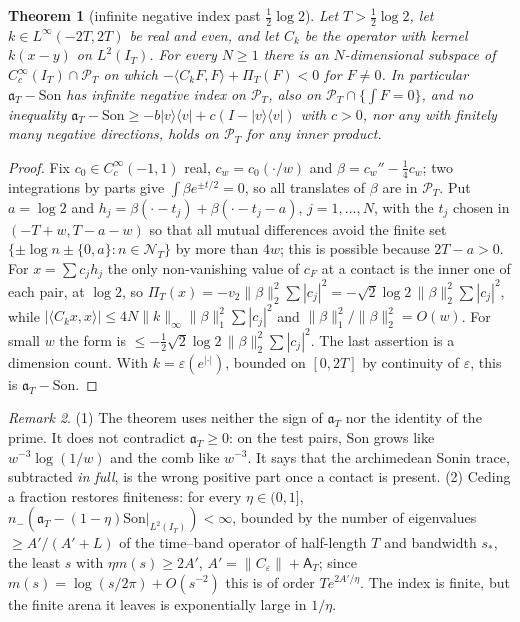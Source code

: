 \documentclass[11pt]{amsart}
\newtheorem{theorem}{Theorem}[section]
\theoremstyle{definition}
\theoremstyle{remark}
\newtheorem{remark}[theorem]{Remark}
\newcommand{\IT}{I_T}
\newcommand{\PT}{\mathcal P_T}
\newcommand{\cF}{c_F}
\newcommand{\NT}{\mathcal N_T}
\newcommand{\Aconst}{\mathsf A_T}
\newcommand{\PiT}{\Pi_T}
\newcommand{\Son}{\mathrm{Son}}
\begin{document}
\begin{theorem}[infinite negative index past $\frac12\log2$]\label{thm:nogo}
Let $T>\frac12\log2$, let $k\in L^\infty(-2T,2T)$ be real and even, and let $C_k$ be the operator with kernel
$k(x-y)$ on $L^2(\IT)$. For every $N\ge1$ there is an $N$-dimensional subspace of $C_c^\infty(\IT)\cap\PT$ on which
$-\langle C_kF,F\rangle+\PiT(F)<0$ for $F\neq0$. In particular $\mathfrak a_T-\Son$ has infinite negative index on
$\PT$, also on $\PT\cap\{\int F=0\}$, and no inequality
$\mathfrak a_T-\Son\ge-b|v\rangle\langle v|+c(I-|v\rangle\langle v|)$ with $c>0$, nor any with finitely many negative
directions, holds on $\PT$ for any inner product.
\end{theorem}
\begin{proof}
Fix $c_0\in C_c^\infty(-1,1)$ real, $c_w=c_0(\cdot/w)$ and $\beta=c_w''-\frac14c_w$; two integrations by parts give
$\int\beta e^{\pm t/2}=0$, so all translates of $\beta$ are in $\PT$. Put $a=\log2$ and
$h_j=\beta(\cdot-t_j)+\beta(\cdot-t_j-a)$, $j=1,\dots,N$, with the $t_j$ chosen in $(-T+w,T-a-w)$ so that all mutual
differences avoid the finite set $\{\pm\log n\pm\{0,a\}:n\in\NT\}$ by more than $4w$; this is possible because
$2T-a>0$. For $x=\sum c_jh_j$ the only non-vanishing value of $\cF$ at a contact is the inner one of each pair, at
$\log2$, so $\PiT(x)=-v_2\|\beta\|_2^2\sum|c_j|^2=-\sqrt2\log2\,\|\beta\|_2^2\sum|c_j|^2$, while
$|\langle C_kx,x\rangle|\le4N\|k\|_\infty\|\beta\|_1^2\sum|c_j|^2$ and $\|\beta\|_1^2/\|\beta\|_2^2=O(w)$. For small $w$
the form is $\le-\frac12\sqrt2\log2\,\|\beta\|_2^2\sum|c_j|^2$. The last assertion is a dimension count. With
$k=\varepsilon(e^{|\cdot|})$, bounded on $[0,2T]$ by continuity of $\varepsilon$, this is $\mathfrak a_T-\Son$.
\end{proof}

\begin{remark}
(1) The theorem uses neither the sign of $\mathfrak a_T$ nor the identity of the prime. It does not contradict
$\mathfrak a_T\ge0$: on the test pairs, $\Son$ grows like $w^{-3}\log(1/w)$ and the comb like $w^{-3}$. It says that the
archimedean Sonin trace, subtracted \emph{in full}, is the wrong positive part once a contact is present. (2) Ceding a
fraction restores finiteness: for every $\eta\in(0,1]$, $n_-(\mathfrak a_T-(1-\eta)\Son|_{L^2(\IT)})<\infty$, bounded by the
number of eigenvalues $\ge A'/(A'+L)$ of the time--band operator of half-length $T$ and bandwidth $s_*$, the least $s$
with $\eta m(s)\ge2A'$, $A'=\|C_\varepsilon\|+\Aconst$; since $m(s)=\log(s/2\pi)+O(s^{-2})$ this is of order
$Te^{2A'/\eta}$. The index is finite, but the finite arena it leaves is exponentially large in $1/\eta$.
\end{remark}
\end{document}
